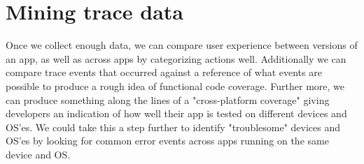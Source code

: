 \section{Mining trace data}
\label{section:datamining}
Once we collect enough data, we can compare user experience between versions
of an app, as well as across apps by categorizing actions well. Additionally
we can compare trace events that occurred against a reference of what events
are possible to produce a rough idea of functional code coverage. Further
more, we can produce something along the lines of a "cross-platform coverage"
giving developers an indication of how well their app is tested on different
devices and OS'es. We could take this a step further to identify "troublesome"
devices and OS'es by looking for common error events across apps running on the
same device and OS.

